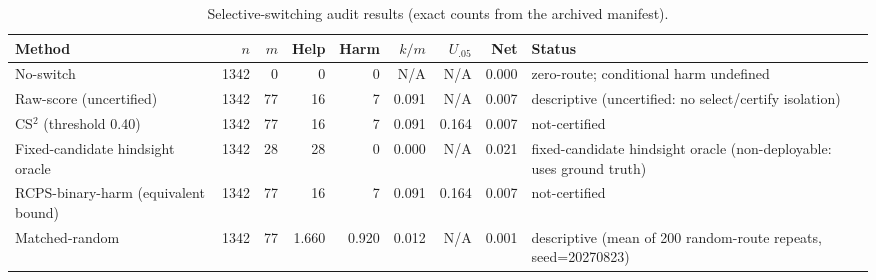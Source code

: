 \begin{table}[t]
\centering
\caption{Selective-switching audit results (exact counts from the archived manifest).}
\label{tab:cs2_main}
\begin{tabular}{lrrrrrrrl}
\toprule
Method & $n$ & $m$ & Help & Harm & $k/m$ & $U_{.05}$ & Net & Status \\
\midrule
No-switch & 1342 & 0 & 0 & 0 & N/A & N/A & 0.000 & zero-route; conditional harm undefined \\
Raw-score (uncertified) & 1342 & 77 & 16 & 7 & 0.091 & N/A & 0.007 & descriptive (uncertified: no select/certify isolation) \\
CS$^2$ (threshold 0.40) & 1342 & 77 & 16 & 7 & 0.091 & 0.164 & 0.007 & not-certified \\
Fixed-candidate hindsight oracle & 1342 & 28 & 28 & 0 & 0.000 & N/A & 0.021 & fixed-candidate hindsight oracle (non-deployable: uses ground truth) \\
RCPS-binary-harm (equivalent bound) & 1342 & 77 & 16 & 7 & 0.091 & 0.164 & 0.007 & not-certified \\
Matched-random & 1342 & 77 & 1.660 & 0.920 & 0.012 & N/A & 0.001 & descriptive (mean of 200 random-route repeats, seed=20270823) \\
\bottomrule
\end{tabular}
\end{table}
